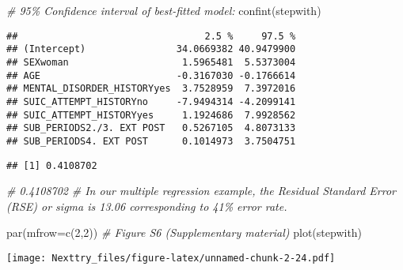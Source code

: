 \documentclass[
]{book}
\newenvironment{Shaded}{\begin{snugshade}}{\end{snugshade}}
\newcommand{\AttributeTok}[1]{\textcolor[rgb]{0.77,0.63,0.00}{#1}}
\newcommand{\CommentTok}[1]{\textcolor[rgb]{0.56,0.35,0.01}{\textit{#1}}}
\newcommand{\DecValTok}[1]{\textcolor[rgb]{0.00,0.00,0.81}{#1}}
\newcommand{\FunctionTok}[1]{\textcolor[rgb]{0.00,0.00,0.00}{#1}}
\newcommand{\NormalTok}[1]{#1}
\newcommand{\SpecialCharTok}[1]{\textcolor[rgb]{0.00,0.00,0.00}{#1}}
\begin{document}
\begin{Shaded}
\begin{Highlighting}[]
\CommentTok{\# 95\% Confidence interval of best{-}fitted model:}
\FunctionTok{confint}\NormalTok{(stepwith)}
\end{Highlighting}
\end{Shaded}

\begin{verbatim}
##                                 2.5 %     97.5 %
## (Intercept)                34.0669382 40.9479900
## SEXwoman                    1.5965481  5.5373004
## AGE                        -0.3167030 -0.1766614
## MENTAL_DISORDER_HISTORYyes  3.7528959  7.3972016
## SUIC_ATTEMPT_HISTORYno     -7.9494314 -4.2099141
## SUIC_ATTEMPT_HISTORYyes     1.1924686  7.9928562
## SUB_PERIODS2./3. EXT POST   0.5267105  4.8073133
## SUB_PERIODS4. EXT POST      0.1014973  3.7504751
\end{verbatim}

\begin{Shaded}
\end{Shaded}

\begin{verbatim}
## [1] 0.4108702
\end{verbatim}

\begin{Shaded}
\begin{Highlighting}[]
\CommentTok{\# 0.4108702}
\CommentTok{\# In our multiple regression example, the Residual Standard Error (RSE) or sigma is 13.06 corresponding to 41\% error rate.}

\FunctionTok{par}\NormalTok{(}\AttributeTok{mfrow=}\FunctionTok{c}\NormalTok{(}\DecValTok{2}\NormalTok{,}\DecValTok{2}\NormalTok{))}
\CommentTok{\# Figure S6 (Supplementary material)}
\FunctionTok{plot}\NormalTok{(stepwith)}
\end{Highlighting}
\end{Shaded}

\texttt{[image: Nexttry\_files/figure-latex/unnamed-chunk-2-24.pdf]}
\end{document}
